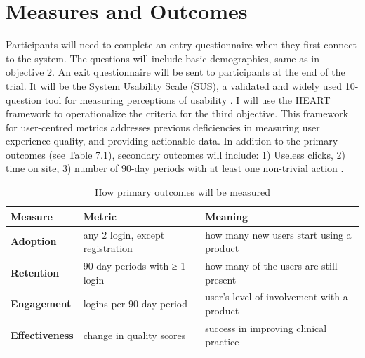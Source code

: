 \section{Measures and Outcomes}
Participants will need to complete an entry questionnaire when they first connect to the system. The questions will include basic demographics, same as in objective 2. An exit questionnaire will be sent to participants at the end of the trial. It will be the System Usability Scale (\gls{SUS}), a validated and widely used 10-question tool for measuring perceptions of usability \cite{united2006research}.
I will use the HEART framework to operationalize the criteria for the third objective. This framework for user-centred metrics addresses previous deficiencies in measuring user experience quality, and providing actionable data. In addition to the primary outcomes (see Table 7.1), secondary outcomes will include: 1) Useless clicks, 2) time on site, 3) number of 90-day periods with at least one non-trivial action \cite{rodden2010measuring}.

\begingroup
\setlength{\tabcolsep}{8pt} %
\renewcommand{\arraystretch}{1.5} %
\small
\begin{table}[h!]
\vspace{-2mm}
\begin{tabular}{l|l|l}
\textbf{Measure}       & \textbf{Metric}                  & \textbf{Meaning}                           \\
\hline                                                                                                    
\textbf{Adoption}      & any 2 login, except registration & how many new users start using a product   \\
\textbf{Retention}     & 90-day periods with ≥ 1 login    & how many of the users are still present    \\
\textbf{Engagement}    & logins per 90-day period         & user’s level of involvement with a product \\
\textbf{Effectiveness} & change in quality scores         & success in improving clinical practice
\end{tabular}
\caption{How primary outcomes will be measured}
\vspace{-5mm}
\end{table}
\endgroup

